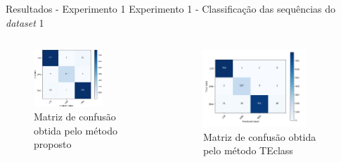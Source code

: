 \documentclass[%
  xcolor=table,%
  10pt,%
  aspectratio = 169,%
  compress,%
  t,%
]{beamer}%
\begin{document}
\begin{frame}{}{Resultados - Experimento 1}
    Experimento 1 - Classificação das sequências do \textit{dataset} 1
    \begin{columns}
        \begin{column}{0.5\textwidth}
            \begin{figure}[H]
                \centering
                \includegraphics[width=0.7\textwidth]{./Figuras/mc-o-teste6.png}
                \caption{Matriz de confusão obtida pelo método proposto}
                \label{fig:mc-o-teste1}
            \end{figure}       
        \end{column}
        \begin{column}{0.5\textwidth}  %
            \begin{figure}
                \centering
                \includegraphics[width=0.8\textwidth]{./Figuras/teclass-o-ds1.png}
                \caption{Matriz de confusão obtida pelo método TEclass}
                \label{fig:mc-o-teclass-ds1}
            \end{figure}
        \end{column}
    \end{columns}
\end{frame}
\end{document}
